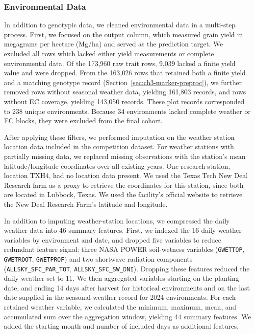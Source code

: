 \subsubsection{Environmental Data}\label{sec:ch3-env-preproc}
In addition to genotypic data, we cleaned environmental data in a multi-step process. First, we focused on the output column, which measured grain yield in megagrams per hectare (Mg/ha) and served as the prediction target. We excluded all rows which lacked either yield measurements or complete environmental data. Of the 173,960 raw trait rows, 9,039 lacked a finite yield value and were dropped. From the 163,026 rows that retained both a finite yield and a matching genotype record (Section~\ref{sec:ch3-marker-preproc}), we further removed rows without seasonal weather data, yielding 161,803 records, and rows without EC coverage, yielding 143,050 records. These plot records corresponded to 238 unique environments. Because 34 environments lacked complete weather or EC blocks, they were excluded from the final cohort.

After applying these filters, we performed imputation on the weather station location data included in the competition dataset. For weather stations with partially missing data, we replaced missing observations with the station's mean latitude/longitude coordinates over all existing years. One research station, location TXH4, had no location data present. We used the Texas Tech New Deal Research farm \cite{txh4} as a proxy to retrieve the coordinates for this station, since both are located in Lubbock, Texas. We used the facility's official website to retrieve the New Deal Research Farm's latitude and longitude.

In addition to imputing weather-station locations, we compressed the daily weather data into 46 summary features. First, we indexed the 16 daily weather variables by environment and date, and dropped five variables to reduce redundant feature signal: three NASA POWER soil-wetness variables (\texttt{GWETTOP}, \texttt{GWETROOT}, \texttt{GWETPROF}) and two shortwave radiation components (\texttt{ALLSKY\_\allowbreak SFC\_\allowbreak PAR\_\allowbreak TOT}, \texttt{ALLSKY\_\allowbreak SFC\_\allowbreak SW\_\allowbreak DNI}). Dropping these features reduced the daily weather set to 11. We then aggregated variables starting on the planting date, and ending 14 days after harvest for historical environments and on the last date supplied in the seasonal-weather record for 2024 environments. For each retained weather variable, we calculated the minimum, maximum, mean, and accumulated sum over the aggregation window, yielding 44 summary features. We added the starting month and number of included days as additional features.

